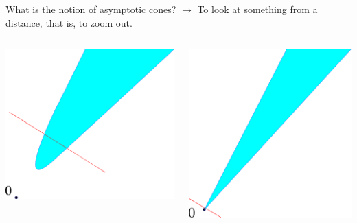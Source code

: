 \documentclass[aspectratio=169, dvipdfmx, 11pt]{beamer} %
\begin{document}
\begin{frame}{What is the notion of asymptotic cones?}
  \pause
  $\rightarrow$ To look at something from a distance, that is, to zoom out.

  \medskip

  \centering
    \begin{columns}
      \pause
      \begin{column}{0.48\textwidth}
      \centering
      \includegraphics[keepaspectratio, scale=0.095]{figures/asymptotic_meaning_1.eps}
      \end{column}
      \pause
      \begin{column}{0.48\textwidth}
      \centering
      \includegraphics[keepaspectratio, scale=0.095]{figures/asymptotic_meaning_2.eps}
    \end{column}
  \end{columns}
\end{frame}
\end{document}
